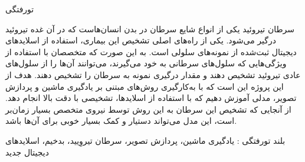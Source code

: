 

\pagestyle{empty}

‌تورفتگی

سرطان تیروئید یکی از انواع شایع سرطان در بدن انسان‌هاست که در آن غده تیروئید درگیر می‌شود.
یکی از راه‌های اصلی تشخیص این بیماری، استفاده از اسلاید‌های دیجیتال ثبت‌شده از نمونه‌‌های سلولی است.
به این صورت که متخصصان با استفاده از ویژگی‌هایی که سلول‌های سرطانی به خود می‌گیرند، می‌توانند آن‌ها را از سلول‌های عادی تیروئید تشخیص دهند و مقدار درگیری نمونه به سرطان را تشخیص دهند.
هدف از این پروژه این است که با به‌کارگیری روش‌های مبتنی بر یادگیری ماشین و پردازش تصویر، مدلی آموزش دهیم که با استفاده از اسلاید‌ها، تشخیصی با دقت بالا انجام دهد. از آنجایی که تشخیص این سرطان به این روش توسط نیروی متخصص بسیار زمان‌بر است، این مدل می‌تواند دستیار و کمک بسیار خوبی برای آن‌ها باشد.

‌بلند
‌تورفتگی :
یادگیری ماشین، پردازش تصویر، سرطان تیروِیید، بدخیم، اسلاید‌های دیجیتال
‌جدید
